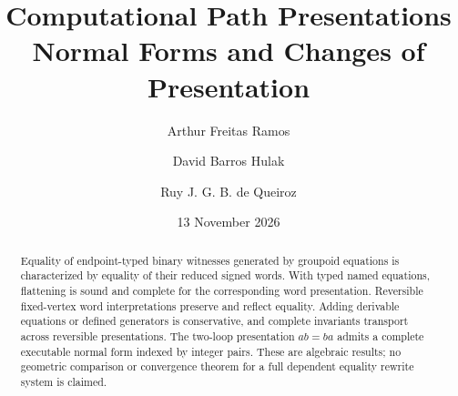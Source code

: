 \documentclass[11pt,a4paper]{article}
\title{Computational Path Presentations\\Normal Forms and Changes of Presentation}
\author{Arthur Freitas Ramos \and David Barros Hulak \and Ruy J. G. B. de Queiroz}
\date{13 November 2026}
\begin{document}
\maketitle
\begin{abstract}
Equality of endpoint-typed binary witnesses generated by groupoid equations
is characterized by equality of their reduced signed words. With typed named
equations, flattening is sound and complete for the corresponding word
presentation. Reversible fixed-vertex word interpretations preserve and reflect
equality. Adding derivable equations or defined generators is conservative,
and complete invariants transport across reversible presentations. The
two-loop presentation \(ab=ba\) admits a complete executable normal form
indexed by integer pairs. These are algebraic results; no geometric comparison
or convergence theorem for a full dependent equality rewrite system is claimed.
\end{abstract}
\begingroup
\small
\tableofcontents
\endgroup



\end{document}
